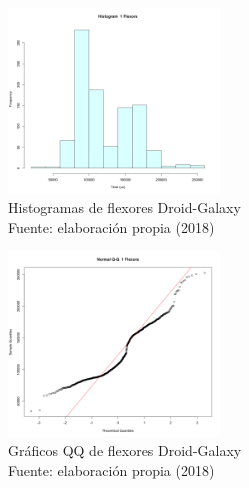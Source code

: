 \begin{figure}
 \begin{center} 
   	\includegraphics[width=0.5\textwidth]{evaluation/graphics/Droid/Galaxy/HistFlexorsDroidGalaxy.png} 
    \caption[Histogramas de flexores Droid-Galaxy]{Histogramas de flexores  Droid-Galaxy\\Fuente: elaboración propia (2018)} 
    \label{fig:droid-galaxy-hist-flexors}
  \end{center}
\end{figure}

\begin{figure}[H]
  \begin{center} 
   	\includegraphics[width=0.5\textwidth]{evaluation/graphics/Droid/Galaxy/NormalQQFlexorsDroidGalaxy.png} 
    \caption[Gráfico QQ de flexores Droid-Galaxy]{Gráficos QQ de flexores Droid-Galaxy\\Fuente: elaboración propia (2018)} 
    \label{fig:droid-galaxy-QQ-flexors}
  \end{center}
\end{figure}

